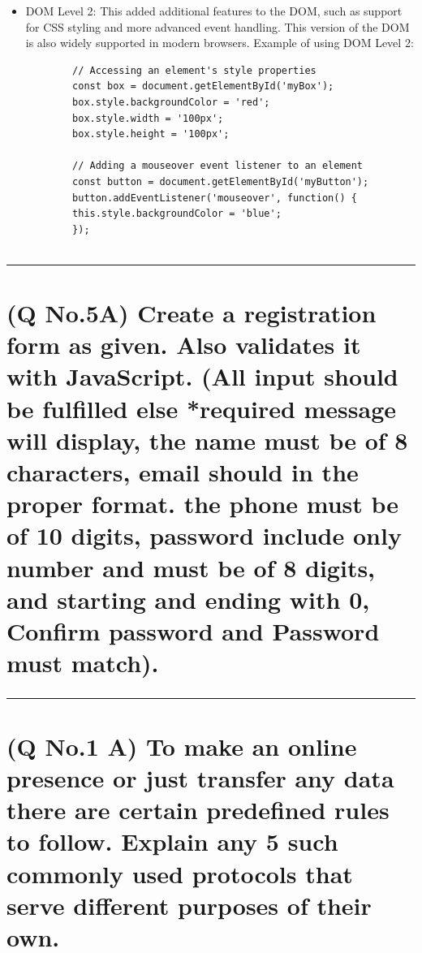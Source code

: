 \documentclass[11pt]{article}
\begin{document}
\begin{itemize}
\begin{lstlisting}
    \end{lstlisting}
    
    \item DOM Level 2: This added additional features to the DOM, such as support for CSS styling and more advanced event handling. This version of the DOM is also widely supported in modern browsers.
    Example of using DOM Level 2:
    \begin{lstlisting}
        // Accessing an element's style properties
        const box = document.getElementById('myBox');
        box.style.backgroundColor = 'red';
        box.style.width = '100px';
        box.style.height = '100px';
    
        // Adding a mouseover event listener to an element
        const button = document.getElementById('myButton');
        button.addEventListener('mouseover', function() {
        this.style.backgroundColor = 'blue';
        });
    
    \end{lstlisting}
\end{itemize}


\noindent\rule{\linewidth}{0.4pt}
\section{(Q No.5A) Create a registration form as given. Also validates it with JavaScript. (All input should be fulfilled else *required message will display, the name must be of 8 characters, email should in the proper format. the phone must be of 10 digits, password include only number and must be of 8 digits, and starting and ending with 0, Confirm password and Password must match).}
\subparagraph{}



\noindent\rule{\linewidth}{0.4pt}
\section{(Q No.1 A) To make an online presence or just transfer any data there are certain predefined rules to follow. Explain any 5 such commonly used protocols that serve different purposes of their own.}
\subparagraph{}
\end{document}
